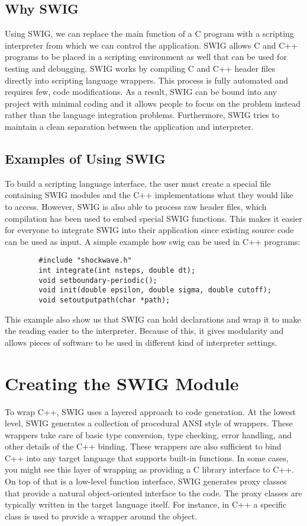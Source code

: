 \documentclass[english,12pt,oneside,a4paper]{article}
\begin{document}
		\subsection{Why SWIG}
		Using SWIG, we can replace the main function of a C program with a scripting interpreter from which we can control the application. SWIG allows C and C++ programs to be placed in a scripting environment as well that can be used for testing and debugging. SWIG works by compiling C and C++ header files directly into scripting language wrappers. This process is fully automated and requires few, code modifications. As a result, SWIG can be bound into any project with minimal coding and it allows people to focus on the problem instead rather than the language integration problems. Furthermore, SWIG tries to maintain a clean separation between the application and interpreter. 
		\subsection{Examples of Using SWIG}
		To build a scripting language interface, the user must create a special file containing SWIG modules and the C++ implementations what they would like to access. However, SWIG is also able to process raw header files, which compilation has been used to embed special SWIG functions. This makes it easier for everyone to integrate SWIG into their application since existing source code can be used as input. A simple example how swig can be used in C++ programs:
		\begin{verbatim}
		#include "shockwave.h"
		int integrate(int nsteps, double dt);
		void setboundary-periodic();
		void init(double epsilon, double sigma, double cutoff); 
		void setoutputpath(char *path);
		\end{verbatim}

		This example also show us that SWIG can hold declarations and wrap it to make the reading easier to the interpreter.
		Because of this, it gives modularity and allows pieces of software to be used in different kind of interpreter settings.
		
				
		\section{Creating the SWIG Module}
		To wrap C++, SWIG uses a layered approach to code generation. At the lowest level, SWIG generates a collection of procedural ANSI style of wrappers. These wrappers take care of basic type conversion, type checking, error handling, and other details of the C++ binding. These wrappers are also sufficient to bind C++ into any target language that supports built-in functions. In some cases, you might see this layer of wrapping as providing a C library interface to C++. On top of that is a low-level function interface, SWIG generates proxy classes that provide a natural object-oriented  interface to the code. The proxy classes are typically written in the target language itself. For instance, in C++  a specific class is used to provide a wrapper around the object.
\end{document}
